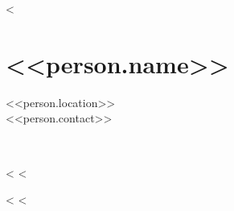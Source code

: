 <%



\section{<<person.name>>}
<<person.location>>\\
<<person.contact>>

\vspace{0.05\textheight}
​
\hspace*{-0.05\textwidth}
\begin{minipage}[t]{0.6\textwidth}
<%
<%
\end{minipage}
\noindent
\hspace{0.05\textwidth}
\begin{minipage}[t]{0.395\textwidth}
<%
<%
\end{minipage}

